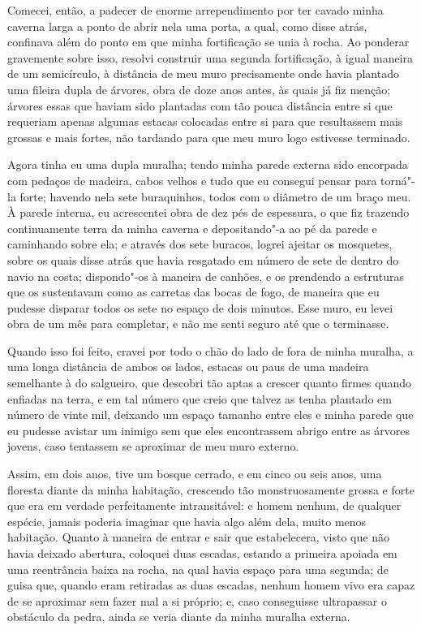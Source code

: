 Comecei, então, a padecer de enorme arrependimento por ter cavado minha
caverna larga a ponto de abrir nela uma porta, a qual, como disse atrás,
confinava além do ponto em que minha fortificação se unia à rocha. Ao
ponderar gravemente sobre isso, resolvi construir uma segunda
fortificação, à igual maneira de um semicírculo, à distância de meu muro
precisamente onde havia plantado uma fileira dupla de árvores, obra de
doze anos antes, às quais já fiz menção; árvores essas que haviam sido
plantadas com tão pouca distância entre si que requeriam apenas algumas
estacas colocadas entre si para que resultassem mais grossas e mais
fortes, não tardando para que meu muro logo estivesse terminado.

Agora tinha eu uma dupla muralha; tendo minha parede externa sido
encorpada com pedaços de madeira, cabos velhos e tudo que eu consegui
pensar para torná"-la forte; havendo nela sete buraquinhos, todos com o
diâmetro de um braço meu. À parede interna, eu acrescentei obra de dez
pés de espessura, o que fiz trazendo continuamente terra da minha
caverna e depositando"-a ao pé da parede e caminhando sobre ela; e
através dos sete buracos, logrei ajeitar os mosquetes, sobre os quais
disse atrás que havia resgatado em número de sete de dentro do navio na
costa; dispondo"-os à maneira de canhões, e os prendendo a estruturas que
os sustentavam como as carretas das bocas de fogo, de maneira que eu
pudesse disparar todos os sete no espaço de dois minutos. Esse muro, eu
levei obra de um mês para completar, e não me senti seguro até que o
terminasse.

Quando isso foi feito, cravei por todo o chão do lado de fora de minha
muralha, a uma longa distância de ambos os lados, estacas ou paus de uma
madeira semelhante à do salgueiro, que descobri tão aptas a crescer
quanto firmes quando enfiadas na terra, e em tal número que creio que
talvez as tenha plantado em número de vinte mil, deixando um espaço
tamanho entre eles e minha parede que eu pudesse avistar um inimigo sem
que eles encontrassem abrigo entre as árvores jovens, caso tentassem se
aproximar de meu muro externo.

Assim, em dois anos, tive um bosque cerrado, e em cinco ou seis anos,
uma floresta diante da minha habitação, crescendo tão monstruosamente
grossa e forte que era em verdade perfeitamente intransitável: e homem
nenhum, de qualquer espécie, jamais poderia imaginar que havia algo além
dela, muito menos habitação. Quanto à maneira de entrar e sair que
estabelecera, visto que não havia deixado abertura, coloquei duas
escadas, estando a primeira apoiada em uma reentrância baixa na rocha,
na qual havia espaço para uma segunda; de guisa que, quando eram
retiradas as duas escadas, nenhum homem vivo era capaz de se aproximar
sem fazer mal a si próprio; e, caso conseguisse ultrapassar o obstáculo
da pedra, ainda se veria diante da minha muralha externa.


